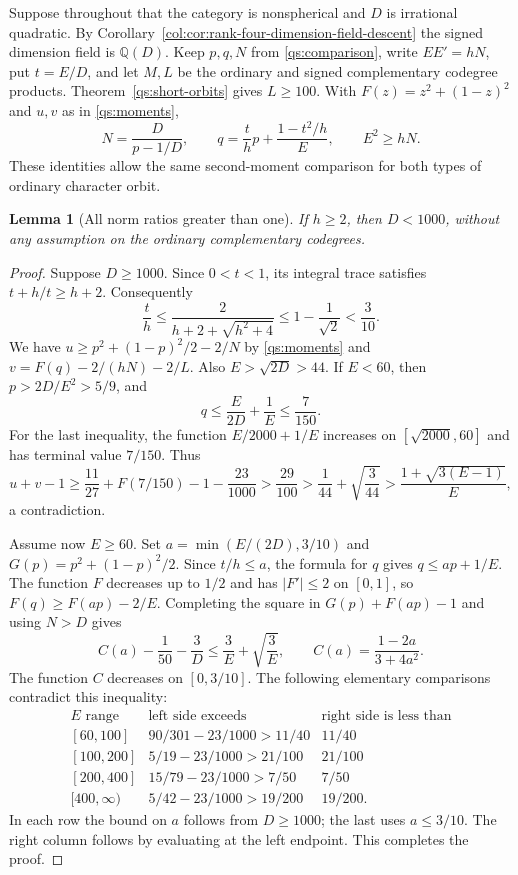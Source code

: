 \documentclass[11pt,a4paper]{article}
\newtheorem{lemma}[theorem]{Lemma}
\theoremstyle{definition}\newtheorem{definition}[theorem]{Definition}
\theoremstyle{remark}\newtheorem{remark}[theorem]{Remark}
\newcommand{\Q}{\mathbb Q}
\numberwithin{equation}{section}
\begin{document}
Suppose throughout that the category is nonspherical and $D$ is irrational
quadratic. By Corollary~\ref{col:cor:rank-four-dimension-field-descent}
the signed dimension field is $\Q(D)$. Keep $p,q,N$ from
\eqref{qs:comparison}, write $EE'=hN$, put $t=E/D$, and let $M,L$
be the ordinary and signed complementary codegree products.
Theorem~\ref{qs:short-orbits} gives $L\ge100$. With
$F(z)=z^2+(1-z)^2$ and $u,v$ as in \eqref{qs:moments},
\[
 N=\frac D{p-1/D},\qquad
 q=\frac th p+\frac{1-t^2/h}{E},\qquad E^2\ge hN.
\]
These identities allow the same second-moment comparison for both
types of ordinary character orbit.

\begin{lemma}[All norm ratios greater than one]\label{quad:opt:norm-ratio}
If $h\ge2$, then $D<1000$, without any assumption on the ordinary
complementary codegrees.
\end{lemma}
\begin{proof}
Suppose $D\ge1000$. Since $0<t<1$, its integral trace satisfies
$t+h/t\ge h+2$. Consequently
\[
 \frac th\le\frac2{h+2+\sqrt{h^2+4}}
 \le1-\frac1{\sqrt2}<\frac3{10}.
\]
We have $u\ge p^2+(1-p)^2/2-2/N$ by \eqref{qs:moments} and
$v=F(q)-2/(hN)-2/L$. Also $E>\sqrt{2D}>44$. If $E<60$, then
$p>2D/E^2>5/9$, and
\[
 q\le\frac E{2D}+\frac1E\le\frac7{150}.
\]
For the last inequality, the function $E/2000+1/E$ increases on
$[\sqrt{2000},60]$ and has terminal value $7/150$.
Thus
\[
 u+v-1\ge\frac{11}{27}+F(7/150)-1-\frac{23}{1000}
 >\frac{29}{100}
 >\frac1{44}+\sqrt{\frac3{44}}
 >\frac{1+\sqrt{3(E-1)}}E,
\]
a contradiction.

Assume now $E\ge60$. Set $a=\min(E/(2D),3/10)$ and
$G(p)=p^2+(1-p)^2/2$.
Since $t/h\le a$, the formula for $q$ gives $q\le ap+1/E$.
The function $F$ decreases up to $1/2$ and has $|F'|\le2$ on
$[0,1]$, so $F(q)\ge F(ap)-2/E$. Completing the square in
$G(p)+F(ap)-1$ and using $N>D$ gives
\[
 C(a)-\frac1{50}-\frac3D
 \le\frac3E+\sqrt{\frac3E},\qquad
 C(a)=\frac{1-2a}{3+4a^2}.
\]
The function $C$ decreases on $[0,3/10]$. The following elementary
comparisons contradict this inequality:
\[
\begin{array}{c|c|c}
 E\text{ range}&\text{left side exceeds}&\text{right side is less than}\\\hline
 {[60,100]}&90/301-23/1000>11/40&11/40\\
 {[100,200]}&5/19-23/1000>21/100&21/100\\
 {[200,400]}&15/79-23/1000>7/50&7/50\\
 {[400,\infty)}&5/42-23/1000>19/200&19/200.
\end{array}
\]
In each row the bound on $a$ follows from $D\ge1000$; the last uses
$a\le3/10$. The right column follows by evaluating at the left
endpoint. This completes the proof.
\end{proof}
\end{document}
